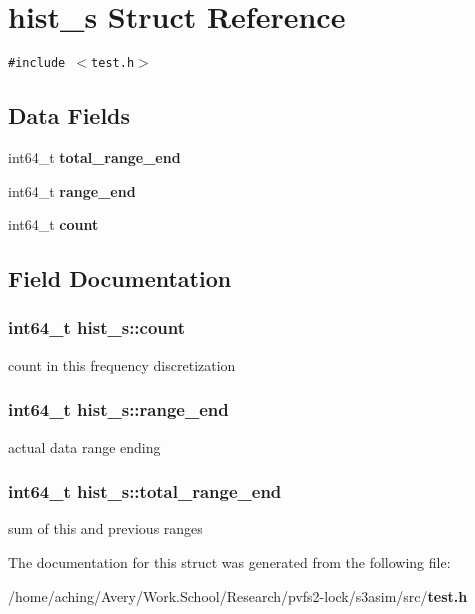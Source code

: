 \section{hist\_\-s Struct Reference}
\label{structhist__s}
{\tt \#include $<$test.h$>$}

\subsection*{Data Fields}
\begin{CompactItemize}
\item 
int64\_\-t \bf{total\_\-range\_\-end}
\item 
int64\_\-t \bf{range\_\-end}
\item 
int64\_\-t \bf{count}
\end{CompactItemize}


\subsection{Field Documentation}
\subsubsection{\setlength{\rightskip}{0pt plus 5cm}int64\_\-t \bf{hist\_\-s::count}}\label{structhist__s_ccf294e3e2b87de7260d0aa34cbb2e09}


count in this frequency discretization 
\subsubsection{\setlength{\rightskip}{0pt plus 5cm}int64\_\-t \bf{hist\_\-s::range\_\-end}}\label{structhist__s_75c6420bb2ccd45f50d9e16ce88eab40}


actual data range ending 
\subsubsection{\setlength{\rightskip}{0pt plus 5cm}int64\_\-t \bf{hist\_\-s::total\_\-range\_\-end}}\label{structhist__s_677eb03bedb34cde85a10942bcda6474}


sum of this and previous ranges 

The documentation for this struct was generated from the following file:\begin{CompactItemize}
\item 
/home/aching/Avery/Work.School/Research/pvfs2-lock/s3asim/src/\bf{test.h}\end{CompactItemize}

